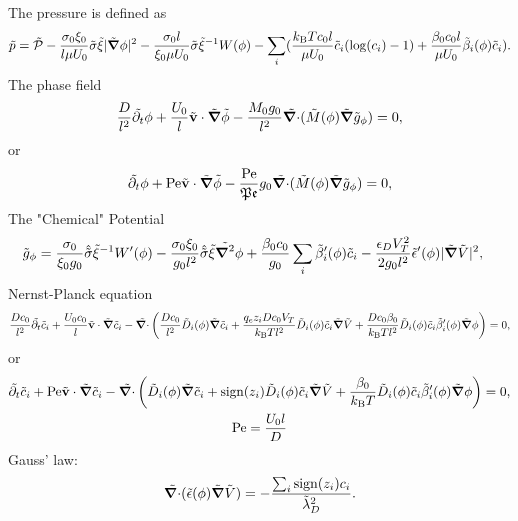 \documentclass[a4paper,10pt]{article}
\renewcommand{\v}[1]{\mathbf{#1}}
\renewcommand{\v}[1]{\ensuremath{\mathbf{#1}}} %
\newcommand{\ti}[1]{\ensuremath{\tilde{#1}}} %
\newcommand{\gv}[1]{\ensuremath{\mbox{\boldmath$ #1 $}}}
\newcommand{\grad}[1]{\gv{\nabla} #1} %
\renewcommand{\div}[1]{\gv{\nabla} \cdot #1} %
\newcommand{\laplacian}[1]{\grad^2 #1}
\newcommand{\pdt}[1]{\partial_t #1}
\begin{document}
The pressure is defined as 
\begin{equation}
\ti{p} = \ti{\mathcal{P}} -   \frac{\sigma_0 \xi_0}{l \mu U_0} \ti{\sigma}\ti{\xi}|\ti{\grad{}} \phi|^2 - \frac{\sigma_0 l}{\xi_0 \mu U_0}\ti{\sigma}\ti{\xi}^{-1} W(\phi)  - \sum_i ( \frac{k_{\mathrm{B}} T c_0 l}{\mu U_0} \ti{c}_i(\log(c_i) -1) + \frac{\beta_0 c_0 l}{\mu U_0}\ti{\beta}_i(\phi) \ti{c}_i ) .
\end{equation}
The phase field
\begin{gather}
\frac{D}{l^2}\ti{\pdt{}} \phi + \frac{U_0}{l}\ti{\v v} \cdot \ti{\grad{}}\ti{\phi} - \frac{M_0 g_0 }{l^2}\ti{\div{}} (\ti{M}(\phi) \ti{\grad{}} \ti{g}_\phi ) = 0,
\end{gather}
or 
\begin{gather}
\ti{\pdt{}} \phi + \mathrm{Pe}\ti{\v v} \cdot \ti{\grad{}}\ti{\phi} - \frac{\mathrm{Pe} }{\mathfrak{Pe}} g_0\ti{\div{}} (\ti{M}(\phi) \ti{\grad{}} \ti{g}_\phi ) = 0,
\end{gather}
The "Chemical" Potential
\begin{align}
\tilde{g}_\phi &= \frac{\sigma_0}{\xi_0 g_0 }\hat{\ti{\sigma}}\ti{\xi}^{-1}W'(\phi) - \frac{\sigma_0 \xi_0}{g_0 l^2}\hat{\ti{\sigma}}\ti{\xi}\ti{\laplacian{}}\phi + \frac{\beta_0 c_0}{g_0}\sum_i \ti{\beta}_i'(\phi) \ti{c}_i - \frac{\epsilon_D V_T^2}{2 g_0 l^2} \ti{\epsilon}'(\phi) | \ti{\grad{}} \ti{V} |^2 ,
\end{align}
Nernst-Planck equation 
\begin{gather}
\frac{D c_0}{l^2}\ti{\pdt{}} \ti{c}_i + \frac{U_0 c_0}{l}\ti{\v{v}} \cdot \ti{\grad{}} \ti{c}_i - \ti{\div{}} \left( \frac{D c_0}{l^2}\ti{D}_{i} (\phi) \ti{\grad{}} \ti{c}_i + \frac{ q_e  z_i D c_0 V_T}{k_{\rm B} T l^2}\ti{D}_i(\phi)\ti{c}_i \ti{\grad{}} \ti{V} +\frac{D c_0 \beta_0}{k_{\rm B} T l^2}\ti{D}_i(\phi)\ti{c}_i\ti{\beta}_i'(\phi) \ti{\grad{}} \phi \right) = 0, 
\end{gather}
or 
\begin{gather}
\ti{\pdt{}} \ti{c}_i + \mathrm{Pe}\ti{\v{v}} \cdot \ti{\grad{}} \ti{c}_i - \ti{\div{}} \left( \ti{D}_{i} (\phi) \ti{\grad{}} \ti{c}_i + \mathrm{sign}(z_i)\ti{D}_i(\phi)\ti{c}_i \ti{\grad{}} \ti{V} +\frac{ \beta_0}{k_{\rm B} T }\ti{D}_i(\phi)\ti{c}_i\ti{\beta}_i'(\phi) \ti{\grad{}} \phi \right) = 0,\\ 
\mathrm{Pe} = \frac{U_0 l}{D }
\end{gather}
Gauss' law: 
\begin{gather}
\ti{\div{}} ( \ti{\epsilon} (\phi) \ti{\grad{}} \ti{V} ) = - \frac{\sum_i \mathrm{sign}(z_i) c_i}{\ti{\lambda}_D^2}.
\end{gather}
\newpage
\end{document}
